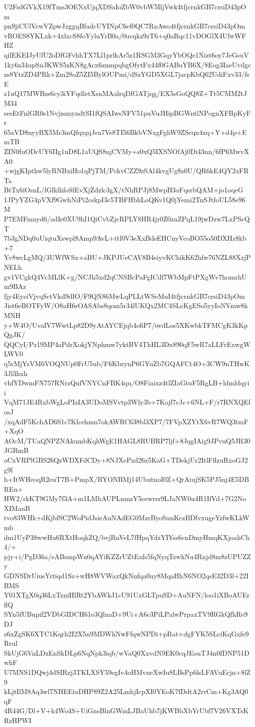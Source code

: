 U2FsdGVkX19fTms3OENxUjqXDSaIoZbW0vbW5IljVwk4tfjcrnkGB7crsiD43pOm
pn9jiCUlVcwVZpwJxggqBfadcUYINpC6ef0QC7RnAwo4tfjcrnkGB7crsiD43pOm
vROES8YKLxk+4xlxcS8foYyluYrB0a/0ucqkz9zT6+q0aRqc11vDOGlX4UfwWFHZ
qifEKEIJyUfU2oDfGFvhhTX7Ll1prlkAr5z1RSGM3GqyYbOQe1Nizt6oy7JeGsuV
1ky6z34upSuJKWS5zKN8gAcx6zmupqbgOfytFx44f0GABuYB6X/8Eog3IaeUvdgc
zs8YtzZD4PRk+Zm28oZ5ZI5BylOUPmi/dSzYGD5XGL7jacpKbQ62UdiFxv33/fsE
z1uQ17MWBzs6cy3iYFqdletXsnMAalrqDfGATjqg/EX5sGoQQ8Z+Tt5CMM2tJM34
sesEtFnlGR0s1NvjmmyndtSI1fQSAIwsNFV51puVuJHipBGWntlNPognXFBpKyFr
65aVD8nyyBX5Mr3mQfqxpjJsu7Vs8TI56BkbVNxgFghW9ZScqn4xq+Y+d4p+EmTB
ZIN0fuODcUY6IIg1uD8L1aUQS8njCVMy+s0xQ5IXSNOfAj0Di43nn/6fP6MwvXA0
+wjgKIpthw5lyRNBxiHo1qPjTM/PckvCZZ9zSAl4kvgUg8z0U/QR6kE4QY2xFRTa
BtTx6iOsnL/lGfklhfoSfEvXjZdzlc3gX/tNhRPJj8MwpH3aFqsrbQAM+jo1oqeG
1JPyYZG4pVXf9GwhNiPi2cskpI3c5TBFHbhLoQKv1Q0jYemi2TnSJtfoUL58e96M
P7EMFmuyd6/adIe0XU9hI1QiCvbZjcRPLY8HR4jr0Z0znZPqL19jwDzw7LxPScQT
7b3gNDq0uUiqtuXswpl8Amp9AvL+ttl0V3eXxBdsEHCnyVcoBO55o50DXHz8kb+7
Yv8wcLgMQ/3UWfWSx+aBU+JKPJUeCAV8B4siyvKChikK62hfw76NZL88XzjPNELh
gv1VCgkQ4VcMLlK+g/NCJh5xd2qCNSBcPaFgICdf7WbMpFtPXgWv7homrhUm9BAz
fjy4EyciVjvqSctVkd9dIO/F9QN86MwLqPLLtWSeMuI4tfjcrnkGB7crsiD43pOm
Jist6eBOTFyW/O8aH6rOASAbs8qom5r34lUKQx2MC4SLcKgESo5yyIoNVmw8kMNH
y+W4O/UvaIV7WwtLp82D9yAtAYCEjqb4o6P7/iwdLos5XKwbkTFMCgK3kKpQgJK/
QQCyI/Pz19MP4aPdrXokjYNphmw7yktBV4ThHL3Dx890qF5wR7aLLFrExwgWLWV0
q5rMjYzVM6VOQNUp0FrU5ub/F6KbrynP6GYuZb7GQAFCt4O+3CW9nTHwK3Jl3hxh
vhfYDwmFN757RNrzQufVNYCnFBK4qu/O8Fiaixz4tlZIaGtuF5RgLB+ldmldqyii
VqM71JE4RxbWgLoPIzIA3UDoMSVvtp3Wly3b+7Kojf7cJc+6NL+F/r7RNXQEfosJ
/xqAdF5KchAD6S1c7Kfcehmn7okAWRC638bl3XP7/7FVpXZYtX6vR7WQ3tmF+XqO
AOcM/TUaQNPZNAkumbKqhWgE1HAGL8RUBRP7ljf+8JqgIAig9JPvuQ5JR30JGRmB
oCxVRPlGBS26QzWDXFdCDy+8NJXePzd26z5KaG+TDekjUr2ItlFflzuRxoGJ2g9l
h+ItWHeoqR2euT7B+PmpX/BYONBMj14UbutnoI0Z+QrAiujSK5PJ5nj4E5DBREn+
HW2/rkKT9GMy7f3A+m1LMhAUPLnmzY5cewrsr9LJaNW0u4R1IfVd+7G2NoXIManB
tvo83WHk+dKjbfSC2WoPidJsieAuNAdEG0MzrByoSunKczBDfvxugeYzfwKLkWmb
dm1UyP38wwHu6RXtHoqkZQ/bvjRnVeL7fHpqYdzYIYss6cnDmyHmqKXjoahCh4/+
pjy+i/PgD36a/eABsmpWu0qAYiKZZrUZtEafs5fqNyqTzwkNu4Rnjd8m8zUPUZZy
GDNSDrUiusYrtiqd1Sz+wH8WVWaxQkNnfqa0uy8MqaHhN6NO2qsE32D3l+22IBMS
Y01XTgX0q36LxTzniHlRt2YbAWkJ1cU91UxGLTpuSD+AuNFN/loo1iXBoAUErflQ
SYn5fUBupif2VDbGIDCH61e3QlnaD+9Ui+A6c3PiLPalwPrpaxTV9RGkQfhRe9DJ
z6xZgSK6XTC1Kqrh2I2X5n9MDWhNwFfqwNPDi+pRat+dgFYK5SLciKqGxfe9Rrul
SkUjG6VnLDzEnSkDLp6NqNpk3iqb/wVaQ0XxvdN9EK0cqJEouTJ4n0fDNP51DwhF
U7MNS1DQwj4dSIRzj3TKLXSY59egIv4oHMvneXwIu8LBsPp6lsLFAVuEcjn+8lZ9
kLjtIlM8Aq3wl7NHEEiuDHP89Z2A25LmhjIcpXI0YEoK7fDdtA2rrCm+Kg3AQ0qF
4R44G/Dl+V+k4Wo4S+UiGnsBlnGWmLJBaUhb7jKWBbXbYrUbf7V26VXTsKRzHPWI
